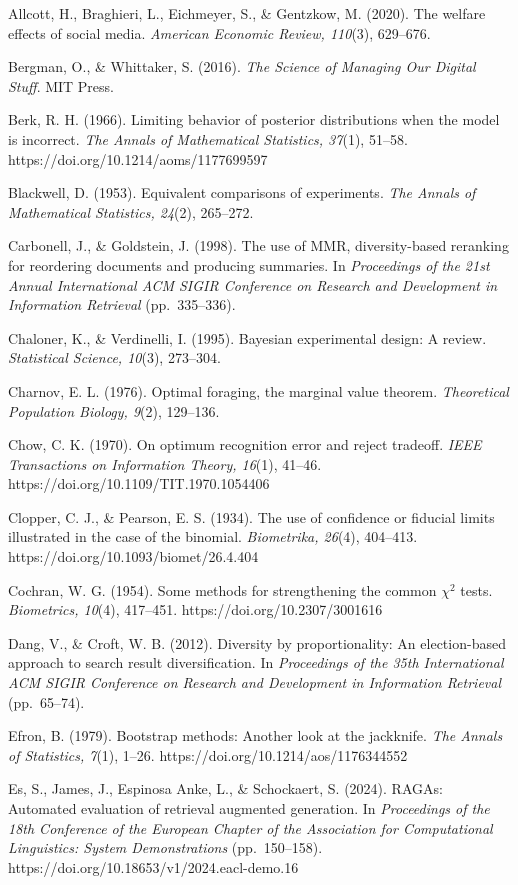 \documentclass[
  11pt]{article}
\begin{document}
Allcott, H., Braghieri, L., Eichmeyer, S., \& Gentzkow, M. (2020). The
welfare effects of social media. \emph{American Economic Review,
110}(3), 629--676.

Bergman, O., \& Whittaker, S. (2016). \emph{The Science of Managing Our
Digital Stuff}. MIT Press.

Berk, R. H. (1966). Limiting behavior of posterior distributions when
the model is incorrect. \emph{The Annals of Mathematical Statistics,
37}(1), 51--58. https://doi.org/10.1214/aoms/1177699597

Blackwell, D. (1953). Equivalent comparisons of experiments. \emph{The
Annals of Mathematical Statistics, 24}(2), 265--272.

Carbonell, J., \& Goldstein, J. (1998). The use of MMR, diversity-based
reranking for reordering documents and producing summaries. In
\emph{Proceedings of the 21st Annual International ACM SIGIR Conference
on Research and Development in Information Retrieval} (pp.~335--336).

Chaloner, K., \& Verdinelli, I. (1995). Bayesian experimental design: A
review. \emph{Statistical Science, 10}(3), 273--304.

Charnov, E. L. (1976). Optimal foraging, the marginal value theorem.
\emph{Theoretical Population Biology, 9}(2), 129--136.

Chow, C. K. (1970). On optimum recognition error and reject tradeoff.
\emph{IEEE Transactions on Information Theory, 16}(1), 41--46.
https://doi.org/10.1109/TIT.1970.1054406

Clopper, C. J., \& Pearson, E. S. (1934). The use of confidence or
fiducial limits illustrated in the case of the binomial.
\emph{Biometrika, 26}(4), 404--413.
https://doi.org/10.1093/biomet/26.4.404

Cochran, W. G. (1954). Some methods for strengthening the common
\(\chi^2\) tests. \emph{Biometrics, 10}(4), 417--451.
https://doi.org/10.2307/3001616

Dang, V., \& Croft, W. B. (2012). Diversity by proportionality: An
election-based approach to search result diversification. In
\emph{Proceedings of the 35th International ACM SIGIR Conference on
Research and Development in Information Retrieval} (pp.~65--74).

Efron, B. (1979). Bootstrap methods: Another look at the jackknife.
\emph{The Annals of Statistics, 7}(1), 1--26.
https://doi.org/10.1214/aos/1176344552

Es, S., James, J., Espinosa Anke, L., \& Schockaert, S. (2024). RAGAs:
Automated evaluation of retrieval augmented generation. In
\emph{Proceedings of the 18th Conference of the European Chapter of the
Association for Computational Linguistics: System Demonstrations}
(pp.~150--158). https://doi.org/10.18653/v1/2024.eacl-demo.16
\end{document}
